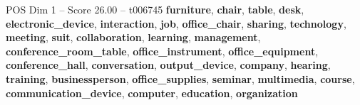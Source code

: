 \begin{textsample}{POS Dim 1 – Score 26.00 – t006745}  \label{ex:f1_pos_023}
\textbf{furniture}, \textbf{chair}, \textbf{table}, \textbf{desk}, \textbf{electronic\_device}, \textbf{interaction}, \textbf{job}, \textbf{office\_chair}, \textbf{sharing}, \textbf{technology}, \textbf{meeting}, \textbf{suit}, \textbf{collaboration}, \textbf{learning}, \textbf{management}, \textbf{conference\_room\_table}, \textbf{office\_instrument}, \textbf{office\_equipment}, \textbf{conference\_hall}, \textbf{conversation}, \textbf{output\_device}, \textbf{company}, \textbf{hearing}, \textbf{training}, \textbf{businessperson}, \textbf{office\_supplies}, \textbf{seminar}, \textbf{multimedia}, \textbf{course}, \textbf{communication\_device}, \textbf{computer}, \textbf{education}, \textbf{organization}

\end{textsample}
